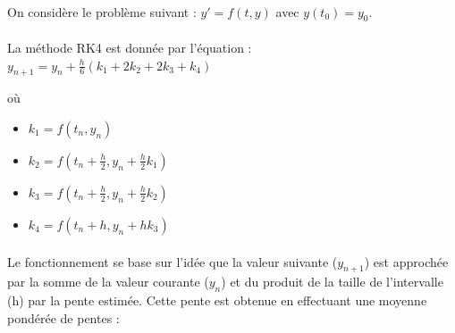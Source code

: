 \documentclass{article}
\begin{document}
            \paragraph{}

            On considère le problème suivant : $y' = f(t,y)$ avec $y(t_0) = y_0$.

            \paragraph{}

            La méthode RK4 est donnée par l'équation : $y_{n+1} = y_n + \frac{h}{6} (k_1 + 2k_2 + 2k_3 + k_4)$
            
            où
            
            \begin{itemize}
                \item $k_1 = f(t_n, y_n)$
                \item $k_2 = f(t_n + \frac{h}{2}, y_n + \frac{h}{2} k_1)$
                \item $k_3 = f(t_n + \frac{h}{2}, y_n + \frac{h}{2} k_2)$
                \item $k_4 = f(t_n + h, y_n + hk_3)$
            \end{itemize}

            \paragraph{}

            Le fonctionnement se base sur l'idée que la valeur suivante ($y_{n+1}$) est approchée par la somme de la valeur courante ($y_n$) et du produit de la taille de l'intervalle (h) par la pente estimée. Cette pente est obtenue en effectuant une moyenne pondérée de pentes : \\
\end{document}

